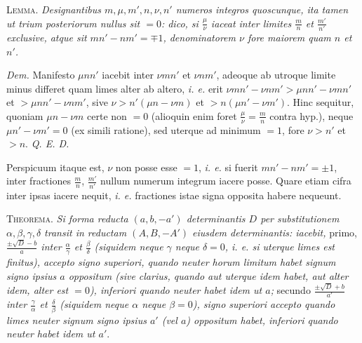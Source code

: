 
\textsc{Lemma.} \textit{Designantibus $m,\mu,m',n,\nu,n'$ numeros integros quoscunque, ita tamen ut trium posteriorum nullus sit $=0$: dico, si $\frac{\mu}{\nu}$ iaceat inter limites $\frac{m}{n}$ et $\frac{m'}{n'}$ exclusive, atque sit $mn'-nm'={\mp1}$, denominatorem $\nu$ fore maiorem quam $n$ et $n'$.}

\textit{Dem.} Manifesto $\mu nn'$ iacebit inter $\nu mn'$ et $\nu nm'$, adeoque ab utroque limite minus differet quam limes alter ab altero, \textit{i. e.} erit $\nu mn'-\nu nm'>\mu nn'-\nu mn'$ et $>\mu nn'-\nu nm'$, sive $\nu>n'(\mu n-\nu m)$ et $>n(\mu n'-\nu m')$. Hinc sequitur, quoniam $\mu n-\nu m$ certe non $=0$ (alioquin enim foret $\frac{\mu}{\nu}=\frac{m}{n}$ contra hyp.), neque $\mu n'-\nu m'=0$ (ex simili ratione), sed uterque ad minimum $=1$, fore $\nu>n'$ et $>n$. \textit{Q. E. D.}

Perspicuum itaque est, $\nu$ non posse esse $=1$, \textit{i. e.} si fuerit $mn'-nm'=\pm1$, inter fractiones $\frac{m}{n}$, $\frac{m'}{n'}$ nullum numerum integrum iacere posse. Quare etiam cifra inter ipsas iacere nequit, \textit{i. e.} fractiones istae signa opposita habere nequeunt.


\textsc{Theorema.} \textit{Si forma reducta $(a,b,-a')$ determinantis $D$ per substitutionem $\alpha,\beta,\gamma,\delta$ transit in reductam $(A,B,-A')$ eiusdem determinantis: iacebit,} primo, \textit{$\frac{\pm\surd D-b}{a}$ inter $\frac{\alpha}{\gamma}$ et $\frac{\beta}{\delta}$ (siquidem neque $\gamma$ neque $\delta=0$, i. e. si uterque limes est finitus), accepto signo superiori, quando neuter horum limitum habet signum signo ipsius $a$ oppositum (sive clarius, quando aut uterque idem habet, aut alter idem, alter est $=0$), inferiori quando neuter habet idem ut $a$;} secundo \textit{$\frac{\pm\surd D+b}{a'}$ inter $\frac{\gamma}{\alpha}$ et $\frac{\delta}{\beta}$ (siquidem neque $\alpha$ neque $\beta=0$), signo superiori accepto quando limes neuter signum signo ipsius $a'$ (vel $a$) oppositum habet, inferiori quando neuter habet idem ut $a'$}.

